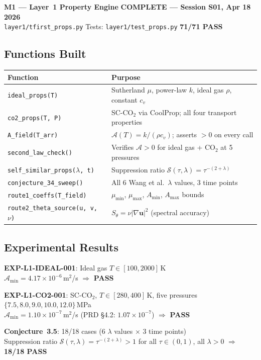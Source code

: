 \documentclass[11pt, a4paper]{article}
\theoremstyle{definition}
\theoremstyle{remark}
\newenvironment{keyresult}{%
  \begin{tcolorbox}[colback=tfgreen!6, colframe=tfgreen!60!black,
    title=\textbf{Key Result}, fonttitle=\small\bfseries,
    breakable, left=4pt, right=4pt, top=4pt, bottom=4pt]
}{%
  \end{tcolorbox}
}
\newenvironment{milestone}{%
  \begin{tcolorbox}[colback=tfblue!5, colframe=tfblue!50!black,
    breakable, left=4pt, right=4pt, top=4pt, bottom=4pt]
}{%
  \end{tcolorbox}
}
\newcommand{\Afield}{\mathcal{A}}
\newcommand{\lam}{\lambda}
\newcommand{\PASS}{\textcolor{passgreen}{\textbf{PASS}}}
\newcommand{\thet}{\theta}
\begin{document}
\begin{milestone}
  \textbf{M1 --- Layer~1 Property Engine}
  \hfill {\color{passgreen}\textbf{COMPLETE --- Session S01, Apr 18 2026}}\\[4pt]
  \texttt{layer1/tfirst\_props.py} \quad Tests: \texttt{layer1/test\_props.py}
  \quad \textbf{71/71 PASS}
\end{milestone}

\subsection{Functions Built}

\begin{center}
\begin{tabular}{ll}
\toprule
\textbf{Function} & \textbf{Purpose} \\
\midrule
\texttt{ideal\_props(T)} & Sutherland $\mu$, power-law $k$, ideal gas $\rho$, constant $c_v$ \\
\texttt{co2\_props(T, P)} & SC-CO$_2$ via CoolProp; all four transport properties \\
\texttt{A\_field(T\_arr)} & $\Afield(T) = k/(\rho c_v)$; asserts $> 0$ on every call \\
\texttt{second\_law\_check()} & Verifies $\Afield > 0$ for ideal gas + CO$_2$ at 5 pressures \\
\texttt{self\_similar\_props($\lambda$, t)} & Suppression ratio $\mathcal{S}(\tau,\lam) = \tau^{-(2+\lam)}$ \\
\texttt{conjecture\_34\_sweep()} & All 6 Wang et al.\ $\lam$ values, 3 time points \\
\texttt{route1\_coeffs(T\_field)} & $\mu_{\min}$, $\mu_{\max}$, $A_{\min}$, $A_{\max}$ bounds \\
\texttt{route2\_theta\_source(u, v, $\nu$)} & $S_\thet = \nu|\nabla\mathbf{u}|^2$ (spectral accuracy) \\
\bottomrule
\end{tabular}
\end{center}

\subsection{Experimental Results}

\begin{keyresult}
\textbf{EXP-L1-IDEAL-001}: Ideal gas $T \in [100, 2000]$\,K\\
$\Afield_{\min} = 4.17\times10^{-6}$\,m$^2$/s $\Rightarrow$ \PASS

\smallskip
\textbf{EXP-L1-CO2-001}: SC-CO$_2$, $T \in [280,400]$\,K, five pressures
$\{7.5, 8.0, 9.0, 10.0, 12.0\}$\,MPa\\
$\Afield_{\min} = 1.10\times10^{-7}$\,m$^2$/s (PRD §4.2: $1.07\times10^{-7}$) $\Rightarrow$ \PASS

\smallskip
\textbf{Conjecture~3.5}: 18/18 cases (6 $\lam$ values $\times$ 3 time points)\\
Suppression ratio $\mathcal{S}(\tau,\lam) = \tau^{-(2+\lam)} > 1$ for all $\tau \in (0,1)$, all $\lam > 0$
$\Rightarrow$ \textbf{18/18 PASS}
\end{keyresult}
\end{document}
